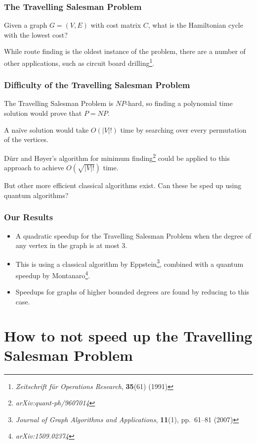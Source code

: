 \documentclass[]{beamer}
\begin{document}
\begin{frame}
\frametitle{The Travelling Salesman Problem}
Given a graph $G = (V, E)$ with cost matrix $C$, what is the Hamiltonian cycle with the lowest cost?

While route finding is the oldest instance of the problem, there are a number of other applications, such as circuit board drilling\footnote{{\em Zeitschrift f{\"u}r Operations Research}, {\bf 35}(61) (1991)}.
\end{frame}

\begin{frame}
\frametitle{Difficulty of the Travelling Salesman Problem}
The Travelling Salesman Problem is $NP$-hard, so finding a polynomial time solution would prove that $P = NP$.

A na\"ive solution would take $O(|V|!)$ time by searching over every permutation of the vertices.

D\"urr and H\o yer's algorithm for minimum finding\footnote{{\em arXiv:quant-ph/9607014}} could be applied to this approach to achieve $O(\sqrt{|V|!})$ time.

But other more efficient classical algorithms exist. Can these be sped up using quantum algorithms?
\end{frame}

\begin{frame}
\frametitle{Our Results}
\begin{itemize}
\item A quadratic speedup for the Travelling Salesman Problem when the degree of any vertex in the graph is at most $3$.
\item This is using a classical algorithm by Eppstein\footnote{{\em Journal of Graph Algorithms and Applications}, {\bf 11}(1), pp.\ 61--81 (2007)}, combined with a quantum speedup by Montanaro\footnote{{\em arXiv:1509.02374}}.
\item Speedups for graphs of higher bounded degrees are found by reducing to this case.
\end{itemize}
\end{frame}

\section{How to not speed up the Travelling Salesman Problem}
\end{document}
